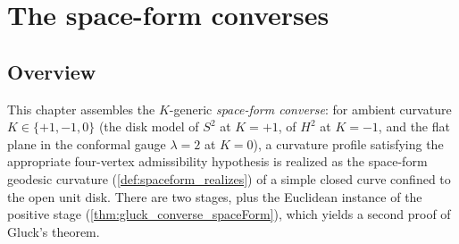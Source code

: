 \chapter{The space-form converses}
\label{chap:spaceform_converse}


\section{Overview}

This chapter assembles the $K$-generic \emph{space-form converse}: for
ambient curvature $K\in\{+1,-1,0\}$ (the disk model of $S^2$ at
$K=+1$, of $H^2$ at $K=-1$, and the flat plane in the
conformal gauge $\lambda=2$ at $K=0$), a curvature profile
satisfying the appropriate four-vertex admissibility hypothesis is realized as
the space-form geodesic curvature (\cref{def:spaceform_realizes}) of a simple
closed curve confined to the open unit disk. There are two stages, plus the
Euclidean instance of the positive stage
(\cref{thm:gluck_converse_spaceForm}), which yields a second proof of Gluck's
theorem.

